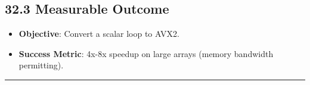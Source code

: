 \hypertarget{measurable-outcome}{%
\subsection{32.3 Measurable Outcome}\label{measurable-outcome}}

\begin{itemize}
\tightlist
\item
  \textbf{Objective}: Convert a scalar loop to AVX2.
\item
  \textbf{Success Metric}: 4x-8x speedup on large arrays (memory
  bandwidth permitting).
\end{itemize}

\begin{center}\rule{0.5\linewidth}{0.5pt}\end{center}
